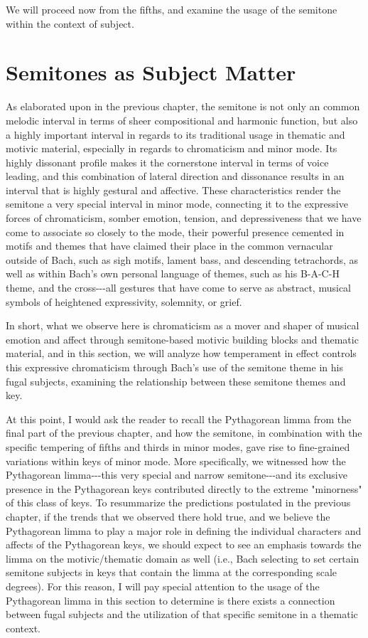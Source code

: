 We will proceed now from the fifths, and examine the usage of the
semitone within the context of subject.

    \section{Semitones as Subject Matter}\label{semitones-as-subject-matter}

As elaborated upon in the previous chapter, the semitone is not only an
common melodic interval in terms of sheer compositional and harmonic
function, but also a highly important interval in regards to its
traditional usage in thematic and motivic material, especially in
regards to chromaticism and minor mode. Its highly dissonant profile
makes it the cornerstone interval in terms of voice leading, and this
combination of lateral direction and dissonance results in an interval
that is highly gestural and affective. These characteristics render the
semitone a very special interval in minor mode, connecting it to the
expressive forces of chromaticism, somber emotion, tension, and
depressiveness that we have come to associate so closely to the mode,
their powerful presence cemented in motifs and themes that have claimed
their place in the common vernacular outside of Bach, such as sigh
motifs, lament bass, and descending tetrachords, as well as within
Bach's own personal language of themes, such as his B-A-C-H theme, and
the cross-\/-\/-all gestures that have come to serve as abstract,
musical symbols of heightened expressivity, solemnity, or grief.

In short, what we observe here is chromaticism as a mover and shaper of
musical emotion and affect through semitone-based motivic building
blocks and thematic material, and in this section, we will analyze how
temperament in effect controls this expressive chromaticism through
Bach's use of the semitone theme in his fugal subjects, examining the
relationship between these semitone themes and key.

At this point, I would ask the reader to recall the Pythagorean limma
from the final part of the previous chapter, and how the semitone, in
combination with the specific tempering of fifths and thirds in minor
modes, gave rise to fine-grained variations within keys of minor mode.
More specifically, we witnessed how the Pythagorean limma-\/-\/-this
very special and narrow semitone-\/-\/-and its exclusive presence in the
Pythagorean keys contributed directly to the extreme "minorness" of this
class of keys. To resummarize the predictions postulated in the previous
chapter, if the trends that we observed there hold true, and we believe
the Pythagorean limma to play a major role in defining the individual
characters and affects of the Pythagorean keys, we should expect to see
an emphasis towards the limma on the motivic/thematic domain as well
(i.e., Bach selecting to set certain semitone subjects in keys that
contain the limma at the corresponding scale degrees). For this reason,
I will pay special attention to the usage of the Pythagorean limma in
this section to determine is there exists a connection between fugal
subjects and the utilization of that specific semitone in a thematic
context.

